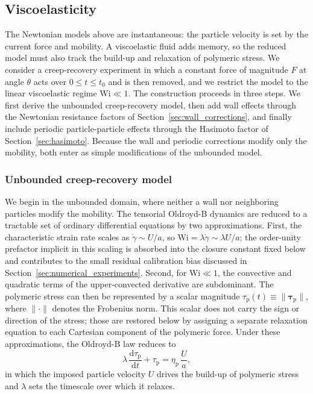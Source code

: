 \documentclass{elsarticle}
\newcommand{\ten}[1]{\boldsymbol{#1}}
\newcommand{\wi}{\mathrm{Wi}}
\begin{document}
\subsection{Viscoelasticity}
\label{sec:ve_rom}

The Newtonian models above are instantaneous: the particle velocity is
set by the current force and mobility. A viscoelastic fluid adds memory,
so the reduced model must also track the build-up and relaxation of
polymeric stress. We consider a creep-recovery experiment in which a
constant force of magnitude $F$ at angle $\theta$ acts over
$0\le t\le t_0$ and is then removed, and we restrict the model to the
linear viscoelastic regime $\wi\ll1$. The construction proceeds in three
steps. We first derive the unbounded creep-recovery model, then add wall
effects through the Newtonian resistance factors of
Section~\ref{sec:wall_corrections}, and finally include periodic
particle-particle effects through the Hasimoto factor of
Section~\ref{sec:hasimoto}. Because the wall and periodic corrections
modify only the mobility, both enter as simple modifications of the
unbounded model.

\subsubsection{Unbounded creep-recovery model}
\label{sec:ve_unbounded}

We begin in the unbounded domain, where neither a wall nor neighboring
particles modify the mobility. The tensorial Oldroyd-B dynamics are
reduced to a tractable set of ordinary differential equations by two
approximations. First, the characteristic strain rate scales as
$\dot\gamma\sim U/a$, so
$\wi=\lambda\dot\gamma\sim\lambda U/a$; the order-unity prefactor
implicit in this scaling is absorbed into the closure constant fixed
below and contributes to the small residual calibration bias discussed in
Section~\ref{sec:numerical_experiments}. Second, for $\wi\ll1$, the
convective and quadratic terms of the upper-convected derivative are
subdominant. The polymeric stress can then be represented by a scalar
magnitude
$\tau_{\mathrm{p}}(t)\equiv\lVert\ten{\tau}_{\mathrm{p}}\rVert$, where
$\lVert\cdot\rVert$ denotes the Frobenius norm. This scalar does not
carry the sign or direction of the stress; those are restored below by
assigning a separate relaxation equation to each Cartesian component of
the polymeric force. Under these approximations, the Oldroyd-B law
reduces to
\begin{equation}
\lambda\,\dfrac{\mathrm{d}\tau_{\mathrm{p}}}{\mathrm{d}t}
+ \tau_{\mathrm{p}} = \eta_{\mathrm{p}}\,\dfrac{U}{a},
\label{eq:scalar_tau_oldroyd_b}
\end{equation}
in which the imposed particle velocity $U$ drives the build-up of
polymeric stress and $\lambda$ sets the timescale over which it relaxes.
\end{document}
